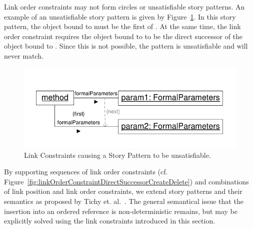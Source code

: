 {Link order constraints may not form circles or unsatisfiable story patterns. An example of an unsatisfiable story pattern is given by Figure~\ref{fig:linkConstraintUnsatisfiablePattern}. In this story pattern, the object bound to  must be the first  of . At the same time, the link order constraint requires the object bound to  to be the direct successor of the object bound to . Since this is not possible, the pattern is unsatisfiable and will never match.


\begin{figure}[htbp]
\center
\includegraphics[width=0.75\columnwidth]{figures/LinkConstraintUnsatisfiablePattern}
\caption{Link Constraints causing a Story Pattern to be unsatisfiable.}
\label{fig:linkConstraintUnsatisfiablePattern}
\end{figure}

By supporting sequences of link order constraints (cf. Figure~\ref{fig:linkOrderConstraintDirectSuccessorCreateDelete}) and combinations of link position and link order constraints, we extend story patterns and their semantics as proposed by Tichy et. al.~\cite{TMG06}. The general semantical issue that the insertion into an ordered reference is non-deterministic remains, but may be explicitly solved using the link constraints introduced in this section. 

}

